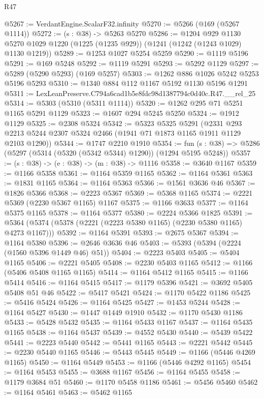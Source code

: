 \begin{lexlean}{R47}
\begin{coremodule}
@5267 := VerdantEngine.ScalarF32.infinity
@5270 := @5266 (@169 (@5267 @1114))
@5272 := (s : @38) -> @5263 @5270
@5286 := @1204
    @929
    @1130
    @5270
    @1029
    @1220
    (@1225 (@1235 @929))
    (@1241 (@1242 (@1243 @1029) @1130 @1219))
@5289 := @1253 @1027 @5254 @5259
@5290 := @1119 @5196
@5291 := @169 @5248
@5292 := @1119 @5291
@5293 := @5292 @1129
@5297 := @5289 (@5290 @5293) (@169 @5257)
@5303 := @1262 @886 @1026 @5242 @5253 @5196 @5293
@5310 := @1340 @884 @112 @1167 @5192 @1130 @5196 @1291
@5311 := LexLeanPreserve.C794a6cad1b5e8fdc98d1387794c0d40c.R47.__rel_25
@5314 := @5303 (@5310 (@5311 @1114))
@5320 := @1262 @295 @71 @5251 @1165 @5291 @1129
@5323 := @1607 @294 @5245 @5250
@5324 := @1912 @1129
@5325 := @2308 @5324
@5342 := @5323
    @5325
    @5291
    (@2331 @293 @2213 @5244 @2307 @5324 @2466 (@1941 @71 @1873 @1165 @1911 @1129 @2103 @1290))
@5344 := @1747 @2210 @1910
@5354 := fun (s : @38) => @5286 (@5297 (@5314 (@5320 (@5342 @5344) @1290)) (@1294 @5195 @5248))
@5357 := (s : @38) -> (e : @38) -> (m : @38) -> @1116
@5358 := @3640 @1167
@5359 := @1166 @5358
@5361 := @1164 @5359 @1165
@5362 := @1164 @5361
@5363 := @1831 @1165
@5364 := @1164 @5363
@5366 := @1561 @3636 @46
@5367 := @1826 @5366
@5368 := @2223 @5367
@5369 := @5368 @1165
@5374 := @2221 @5369 (@2230 @5367 @1165) @1167
@5375 := @1166 @3633
@5377 := @1164 @5375 @1165
@5378 := @1164 @5377
@5380 := @2224 @5366 @1825
@5391 := @5364 (@5374 (@5378 (@2221 (@2223 @5380 @1165) (@2230 @5380 @1165) @4273 @1167)))
@5392 := @1164 @5391
@5393 := @2675 @5367
@5394 := @1164 @5380
@5396 := @2646 @3636 @46
@5403 := @5393 (@5394 (@2224 (@1560 @5396 @1449 @46) @51))
@5404 := @2223 @5403
@5405 := @5404 @1165
@5406 := @2221 @5405
@5408 := @2230 @5403 @1165
@5412 := @1166 (@5406 @5408 @1165 @1165)
@5414 := @1164 @5412 @1165
@5415 := @1166 @5414
@5416 := @1164 @5415
@5417 := @1179 @5396
@5421 := @3692 @5405 @5408 @51 @46
@5422 := @5417 @5421
@5424 := @1170 @5422 @1186
@5425 := @5416 @5424
@5426 := @1164 @5425
@5427 := @1453 @5244
@5428 := @1164 @5427
@5430 := @1447 @1449 @1910
@5432 := @1170 @5430 @1186
@5433 := @5428 @5432
@5435 := @1164 @5433 @1167
@5437 := @1164 @5435 @1165
@5438 := @1164 @5437
@5439 := @4552 @5430
@5440 := @5439 @5422
@5441 := @2223 @5440
@5442 := @5441 @1165
@5443 := @2221 @5442
@5445 := @2230 @5440 @1165
@5446 := @5443 @5445
@5449 := @1166 (@5446 @4269 @1165)
@5450 := @1164 @5449
@5453 := @1166 (@5446 @4292 @1165)
@5454 := @1164 @5453
@5455 := @3688 @1167
@5456 := @1164 @5455
@5458 := @1179 @3684 @51
@5460 := @1170 @5458 @1186
@5461 := @5456 @5460
@5462 := @1164 @5461
@5463 := @5462 @1165

\end{coremodule}
\end{lexlean}

